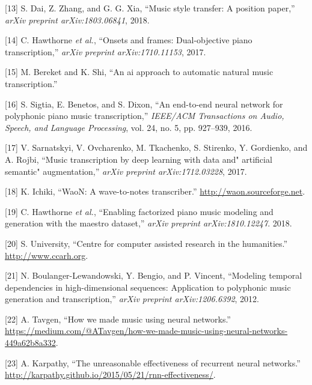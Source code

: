 \documentclass[12pt,]{article}
\begin{document}
\leavevmode\hypertarget{ref-dai2018music}{}%
{[}13{]} S. Dai, Z. Zhang, and G. G. Xia, ``Music style transfer: A
position paper,'' \emph{arXiv preprint arXiv:1803.06841}, 2018.

\leavevmode\hypertarget{ref-hawthorne2017onsets}{}%
{[}14{]} C. Hawthorne \emph{et al.}, ``Onsets and frames: Dual-objective
piano transcription,'' \emph{arXiv preprint arXiv:1710.11153}, 2017.

\leavevmode\hypertarget{ref-bereketai}{}%
{[}15{]} M. Bereket and K. Shi, ``An ai approach to automatic natural
music transcription.''

\leavevmode\hypertarget{ref-sigtia2016end}{}%
{[}16{]} S. Sigtia, E. Benetos, and S. Dixon, ``An end-to-end neural
network for polyphonic piano music transcription,'' \emph{IEEE/ACM
Transactions on Audio, Speech, and Language Processing}, vol. 24, no. 5,
pp. 927--939, 2016.

\leavevmode\hypertarget{ref-sarnatskyi2017music}{}%
{[}17{]} V. Sarnatskyi, V. Ovcharenko, M. Tkachenko, S. Stirenko, Y.
Gordienko, and A. Rojbi, ``Music transcription by deep learning with
data and" artificial semantic" augmentation,'' \emph{arXiv preprint
arXiv:1712.03228}, 2017.

\leavevmode\hypertarget{ref-waon}{}%
{[}18{]} K. Ichiki, ``WaoN: A wave-to-notes transcriber.''
\url{http://waon.sourceforge.net}.

\leavevmode\hypertarget{ref-maestro2018}{}%
{[}19{]} C. Hawthorne \emph{et al.}, ``Enabling factorized piano music
modeling and generation with the maestro dataset,'' \emph{arXiv preprint
arXiv:1810.12247}. 2018.

\leavevmode\hypertarget{ref-ccarh}{}%
{[}20{]} S. University, ``Centre for computer assisted research in the
humanities.'' \\
\url{http://www.ccarh.org}.

\leavevmode\hypertarget{ref-boulanger2012modeling}{}%
{[}21{]} N. Boulanger-Lewandowski, Y. Bengio, and P. Vincent, ``Modeling
temporal dependencies in high-dimensional sequences: Application to
polyphonic music generation and transcription,'' \emph{arXiv preprint
arXiv:1206.6392}, 2012.

\leavevmode\hypertarget{ref-alextavgen}{}%
{[}22{]} A. Tavgen, ``How we made music using neural networks.'' \\
\url{https://medium.com/@ATavgen/how-we-made-music-using-neural-networks-449a62b8a332}.

\leavevmode\hypertarget{ref-karpathy}{}%
{[}23{]} A. Karpathy, ``The unreasonable effectiveness of recurrent
neural networks.'' \\
\url{http://karpathy.github.io/2015/05/21/rnn-effectiveness/}.
\end{document}
